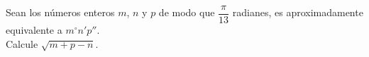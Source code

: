 Sean los números enteros $m$, $n$ y $p$ de modo que $\dfrac{\pi}{13}$ radianes, es aproximadamente equivalente a $m^\circ n'p''$. \\ Calcule $\sqrt{m+p-n}$.
